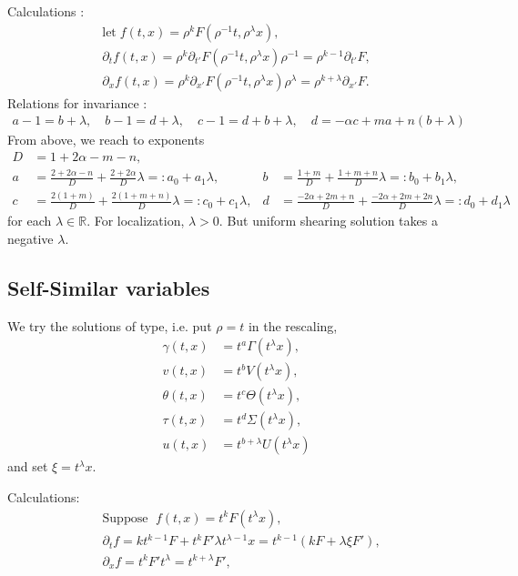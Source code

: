 \documentclass[a4paper,11pt]{article}
\begin{document}
Calculations :
\begin{align*}
 \text{let} \;f(t,x) = \rho^k F(\rho^{-1}t,\rho^\lambda x), \\
 \partial_t f(t,x) = \rho^k \partial_{t'} F(\rho^{-1}t,\rho^\lambda x) \rho^{-1} = \rho^{k-1} \partial_{t'}F, \\
 \partial_x f(t,x) = \rho^k \partial_{x'} F(\rho^{-1}t,\rho^\lambda x) \rho^\lambda = \rho^{k+\lambda} \partial_{x'}F.
\end{align*}
Relations for invariance :
\begin{align*}
 a-1 = b+\lambda, \quad b-1 = d+\lambda, \quad c-1 = d+b+\lambda, \quad d = -\alpha c + m a + n (b+\lambda)
\end{align*}
From above, we reach to exponents
\begin{align*}
 D & = 1+2\alpha-m-n,\\
 a&= \frac{2+2\alpha-n}{D} + \frac{2+2\alpha}{D}\lambda =: a_0 + a_1 \lambda, & b&=\frac{1+m}{D} + \frac{1+m+n}{D}\lambda =: b_0 + b_1\lambda,\\
 c&=\frac{2(1+m)}{D} + \frac{2(1+m+n)}{D}\lambda =: c_0 + c_1\lambda, & d&=\frac{-2\alpha + 2m +n}{D} + \frac{-2\alpha+2m+2n}{D}\lambda =: d_0 + d_1\lambda
\end{align*}
for each $\lambda \in \mathbb{R}$. For localization, $\lambda>0$. But uniform shearing solution takes a negative $\lambda$.
\subsection{Self-Similar variables}
We try the solutions of type, i.e. put $\rho =t$ in the rescaling,
\begin{align*}
 \gamma(t,x) &= t^a\Gamma(t^\lambda x),\\
 v(t,x) &= t^b V(t^\lambda x),\\
 \theta(t,x) &= t^c \Theta(t^\lambda x),\\
 \tau(t,x) &= t^d \Sigma(t^\lambda x),\\
 u(t,x) &= t^{b+\lambda} U(t^\lambda x)
\end{align*}
and set $\xi = t^\lambda x$.

Calculations:
\begin{align*}
 &\text{Suppose } \; f(t,x) = t^k F(t^\lambda x),\\
 &\partial_t f = k t^{k-1} F + t^k F' \lambda t^{\lambda-1} x = t^{k-1} (kF + \lambda\xi F'),\\
 &\partial_x f = t^k F' t^\lambda = t^{k+\lambda} F',
\end{align*}
\end{document}
